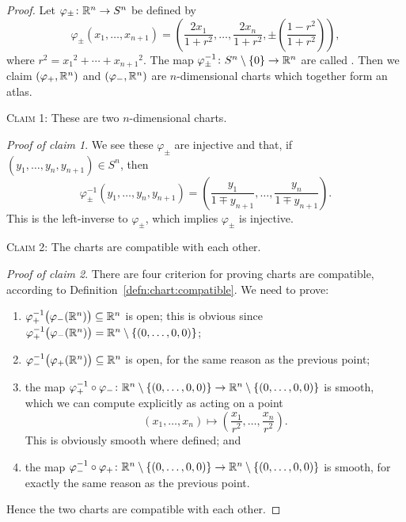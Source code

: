 \begin{proof}
  Let $\varphi_{\pm}\colon\mathbb{R}^{n}\to S^{n}$ be defined by
  \begin{equation}
\varphi_{\pm}(x_{1},\dots,x_{n+1}) = \left(\frac{2x_{1}}{1+r^{2}},
\dots, \frac{2x_{n}}{1+r^{2}}, \pm\left(\frac{1-r^{2}}{1+r^{2}}\right)\right),
  \end{equation}
  where $r^{2} = {x_{1}}^{2}+\cdots+{x_{n+1}}^{2}$. The map
  $\varphi_{\pm}^{-1}\colon S^{n}\setminus\{0\}\to\mathbb{R}^{n}$ are called
  .
  Then we claim $(\varphi_{+},\mathbb{R}^{n})$ and $(\varphi_{-},\mathbb{R}^{n})$ are
  $n$-dimensional charts which together form an atlas.

\smallbreak
  \textsc{Claim 1:} These are two $n$-dimensional charts.

\noindent\textit{Proof of claim 1}.
  We see these $\varphi_{\pm}$ are injective and that, if
  $(y_{1},\dots,y_{n},y_{n+1})\in S^{n}$, then
  \begin{equation}
\varphi_{\pm}^{-1}(y_{1},\dots,y_{n},y_{n+1}) = \left(\frac{y_{1}}{1 \mp y_{n+1}},\dots,\frac{y_{n}}{1 \mp y_{n+1}}\right).
  \end{equation}
  This is the left-inverse to $\varphi_{\pm}$, which implies
  $\varphi_{\pm}$ is injective.

\smallbreak
  \textsc{Claim 2:} The charts are compatible with each other.

\noindent\textit{Proof of claim 2}.
There are four criterion for proving charts are compatible, according to Definition~\ref{defn:chart:compatible}.
We need to prove:
\begin{enumerate}
\item $\varphi_{+}^{-1}\bigl(\varphi_{-}(\mathbb{R}^{n})\bigr)\subseteq\mathbb{R}^{n}$
  is open; this is obvious since $\varphi_{+}^{-1}\bigl(\varphi_{-}(\mathbb{R}^{n})\bigr)=\mathbb{R}^{n}\setminus\{(0,\dots,0,0)\}$;
\item $\varphi_{-}^{-1}\bigl(\varphi_{+}(\mathbb{R}^{n})\bigr)\subseteq\mathbb{R}^{n}$
  is open, for the same reason as the previous point;
\item the map $\varphi_{+}^{-1}\circ\varphi_{-}\colon\mathbb{R}^{n}\setminus\{(0,\dots,0,0)\}\to\mathbb{R}^{n}\setminus\{(0,\dots,0,0)\}$
  is smooth, which we can compute explicitly as acting on a point
  \begin{equation}
(x_{1},\dots,x_{n})\mapsto\left(\frac{x_{1}}{r^{2}},\dots,\frac{x_{n}}{r^{2}}\right).
  \end{equation}
  This is obviously smooth where defined; and
\item the map $\varphi_{-}^{-1}\circ\varphi_{+}\colon\mathbb{R}^{n}\setminus\{(0,\dots,0,0)\}\to\mathbb{R}^{n}\setminus\{(0,\dots,0,0)\}$
is smooth, for exactly the same reason as the previous point.
\end{enumerate}
Hence the two charts are compatible with each other.


\end{proof}
